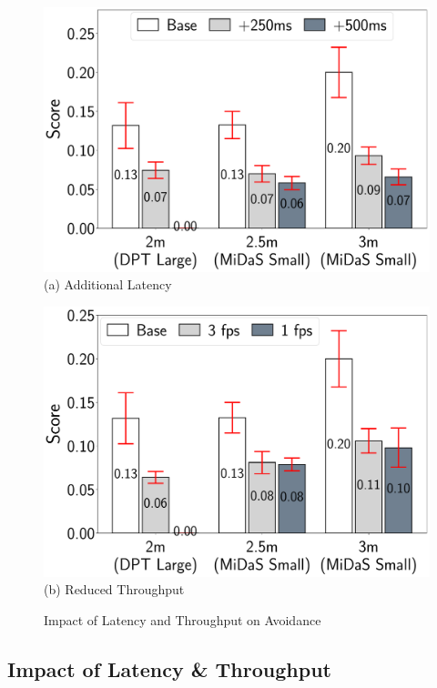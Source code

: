 \begin{figure}
\centering
\begin{minipage}{0.8\linewidth}
\centering
\includegraphics[width=0.96\linewidth]{chapter6/FIGS/fig-avoidance-latency.pdf}
(a) Additional Latency
\end{minipage}
\begin{minipage}{0.8\linewidth}
\centering
\includegraphics[width=0.96\linewidth]{chapter6/FIGS/fig-avoidance-fps.pdf}
(b) Reduced Throughput
\end{minipage}
\caption{Impact of Latency and Throughput on Avoidance}
\label{fig:avoidance-latency-throughput}
\end{figure}

\subsection{Impact of Latency \& Throughput}
\label{sec:avoidance-factors}

